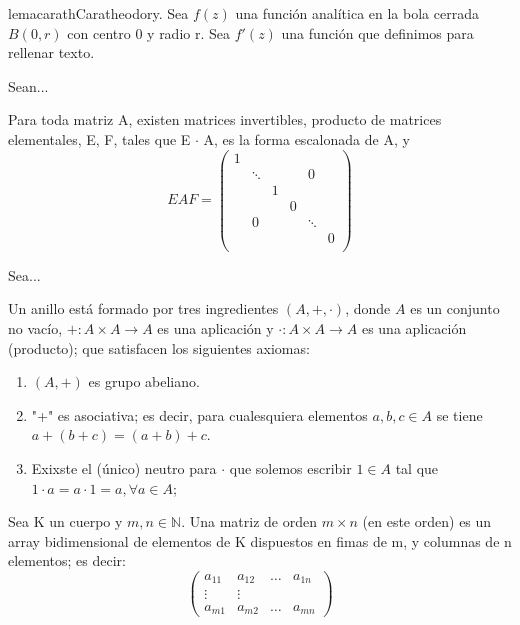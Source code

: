 \documentclass[10pt,a4paper]{article}
\begin{document}
\begin{restatable}{lema}{carath}Caratheodory.\label{lema:carath}
	Sea $f(z)$ una función analítica en la bola cerrada $B(0,r)$ con centro 0 y radio r. Sea $f'(z)$ una función que definimos para rellenar texto.
\end{restatable}

\begin{prop}
	Sean...
\end{prop}

\begin{corol}
	Para toda matriz A, existen matrices invertibles, producto de matrices elementales, E, F, tales que E $\cdot$ A, es la forma escalonada de A, y 
	\[
		EAF=\begin{pmatrix}
			1&\\
			& \ddots& & &  0 \\
			& & 1 & \\
			& & & 0 & \\
			& 0 & & & \ddots\\
			& & & & &0\\
		\end{pmatrix}
	\]
\end{corol}

\begin{lema}
	Sea...
\end{lema}

\begin{definicion}[Anillo] \label{definicion:anillo}
	Un anillo está formado por tres ingredientes $(A,+,\cdot)$, donde $A$ es un conjunto no vacío, $+ : A\times A \rightarrow A$ es una aplicación y $\cdot: A\times A \rightarrow A$ es una aplicación (producto); que satisfacen los siguientes axiomas:
		\begin{enumerate}
		\item  $(A,+)$ es grupo abeliano.
		\item "+" es asociativa; es decir, para cualesquiera elementos $ a,b,c\in A$ se tiene $a+(b+c)=(a+b)+c$.
		\item Exixste el (único) neutro para $\cdot$ que solemos escribir $1\in A$ tal que $1\cdot a=a\cdot 1=a, \forall a\in A$;
	\end{enumerate}
\end{definicion}

\begin{definicion}[Matriz] \label{definicion:matriz}
		Sea K un cuerpo y $m, n\in \mathbb{N}$. Una matriz de orden $m\times n$ (en este orden) es un array bidimensional de elementos de K dispuestos en fimas de m, y columnas de n elementos; es decir:
		\[
		\begin{pmatrix}
			a_{11}&a_{12}& \dots & a_{1n}\\
			\vdots &\vdots \\
			a_{m1}&a_{m2}& \dots & a_{mn}
		\end{pmatrix}
		\]
\end{definicion}
\end{document}
